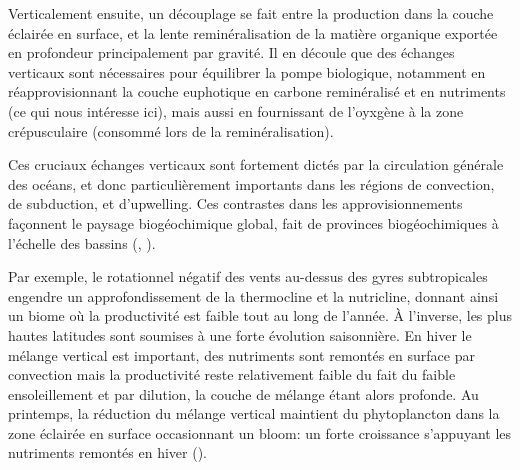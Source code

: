 Verticalement ensuite, un découplage se fait entre la production dans la couche éclairée en surface, et la lente reminéralisation de la matière organique exportée en profondeur principalement par gravité.
Il en découle que des échanges verticaux sont nécessaires pour équilibrer la pompe biologique, notamment en réapprovisionnant la couche euphotique en carbone reminéralisé et en nutriments (ce qui nous intéresse ici), mais aussi en fournissant de l'oyxgène à la zone crépusculaire (consommé lors de la reminéralisation).


Ces cruciaux échanges verticaux sont fortement dictés par la circulation générale des océans, et donc particulièrement importants dans les régions de convection, de subduction, et d'upwelling.
Ces contrastes dans les approvisionnements façonnent le paysage biogéochimique global, fait de provinces biogéochimiques à l'échelle des bassins (, \cite{longhurst_2007,vichi_2011a,williams_2011,bock_2022}).

Par exemple, le rotationnel négatif des vents au-dessus des gyres subtropicales engendre un approfondissement de la thermocline et la nutricline, donnant ainsi un biome où la productivité est faible tout au long de l'année.
À l'inverse, les plus hautes latitudes  sont soumises à une forte évolution saisonnière.
En hiver le mélange vertical est important, des nutriments sont remontés en surface par convection mais la productivité reste relativement faible du fait du faible ensoleillement et par dilution, la couche de mélange étant alors profonde.
Au printemps, la réduction du mélange vertical maintient du phytoplancton dans la zone éclairée en surface occasionnant un bloom: un forte croissance s'appuyant les nutriments remontés en hiver (\cite{wilson_2005,siegel_2002,taylor_2011a,williams_2011}).

\begin{figure}
  \centering
  \label{fig:nutricline-globale}
\end{figure}

